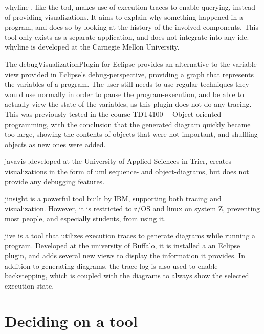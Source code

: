 \Gls{whyline} \cite{ko2009}, like the \gls{tod}, makes use of execution traces to enable querying, instead of providing visualizations.
It aims to explain why something happened in a program, and does so by looking at the history of the involved components.
This tool only exists as a separate application, and does not integrate into any \gls{ide}.
\Gls{whyline} is developed at the Carnegie Mellon University.

The \gls{debugVisualizationPlugin} for Eclipse provides an alternative to the variable view provided in Eclipse's debug-perspective, providing a graph that represents the variables of a program.
The user still needs to use regular techniques they would use normally in order to pause the program-execution, and be able to actually view the state of the variables, as this plugin does not do any tracing.
This was previously tested in the course TDT4100~-~Object oriented programming, with the conclusion that the generated diagram quickly became too large, showing the contents of objects that were not important, and shuffling objects as new ones were added.%

\Gls{javavis} \cite{Oechsle2002},developed at the University of Applied Sciences in Trier, creates visualizations in the form of \gls{uml} sequence- and object-diagrams, but does not provide any debugging features.

\Gls{jinsight} \cite{Pauw} is a powerful tool built by IBM, supporting both tracing and visualization.
However, it is restricted to z/OS and linux on system Z, preventing most people, and especially students, from using it.

\gls{jive} is a tool that utilizes execution traces to generate diagrams while running a program.
Developed at the university of Buffalo, it is installed a an Eclipse plugin, and adds several new views to display the information it provides.
In addition to generating diagrams, the trace log is also used to enable backstepping, which is coupled with the diagrams to always show the selected execution state.

\section{Deciding on a tool}\label{preDiscuss}


